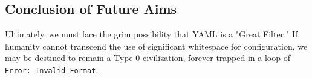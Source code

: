 \documentclass[11pt]{article}
\begin{document}
\subsection{Conclusion of Future Aims}
Ultimately, we must face the grim possibility that YAML is a "Great Filter." If humanity cannot transcend the use of significant whitespace for configuration, we may be destined to remain a Type 0 civilization, forever trapped in a loop of \texttt{Error: Invalid Format}.
\end{document}
